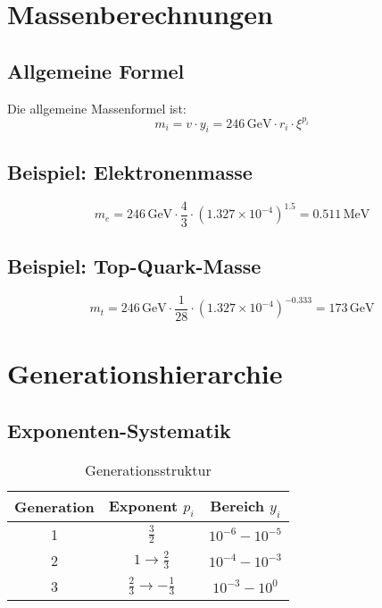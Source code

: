\documentclass[12pt,a4paper]{article}
\newcommand{\xigeom}{\xi}
\begin{document}
	\section{Massenberechnungen}
	
	\subsection{Allgemeine Formel}
	
	Die allgemeine Massenformel ist:
	\begin{equation}
		m_i = v \cdot y_i = 246\,\text{GeV} \cdot r_i \cdot \xigeom^{p_i}
	\end{equation}
	
	\subsection{Beispiel: Elektronenmasse}
	
	\begin{equation}
		m_e = 246\,\text{GeV} \cdot \frac{4}{3} \cdot (1.327 \times 10^{-4})^{1.5} = 0.511\,\text{MeV}
	\end{equation}
	
	\subsection{Beispiel: Top-Quark-Masse}
	
	\begin{equation}
		m_t = 246\,\text{GeV} \cdot \frac{1}{28} \cdot (1.327 \times 10^{-4})^{-0.333} = 173\,\text{GeV}
	\end{equation}
	
	\section{Generationshierarchie}
	
	\subsection{Exponenten-Systematik}
	
	\begin{table}[H]
		\centering
		\caption{Generationsstruktur}
		\begin{tabular}{@{}ccc@{}}
			\toprule
			\textbf{Generation} & \textbf{Exponent} $p_i$ & \textbf{Bereich} $y_i$ \\
			\midrule
			1 & $\frac{3}{2}$ & $10^{-6} - 10^{-5}$ \\
			2 & $1 \rightarrow \frac{2}{3}$ & $10^{-4} - 10^{-3}$ \\
			3 & $\frac{2}{3} \rightarrow -\frac{1}{3}$ & $10^{-3} - 10^0$ \\
			\bottomrule
		\end{tabular}
	\end{table}
	
\end{document}
